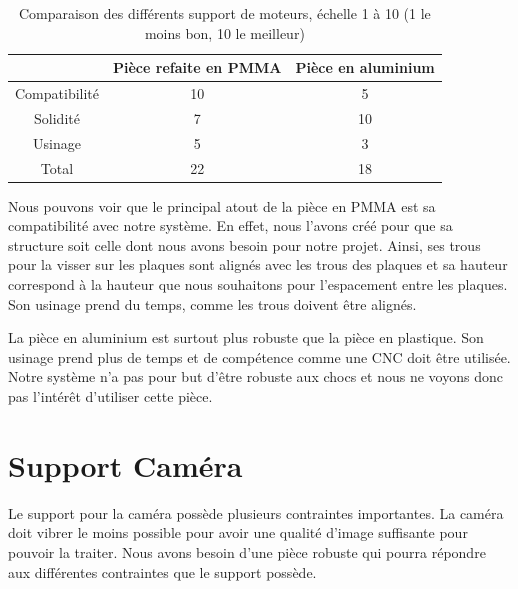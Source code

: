 \documentclass[
	a4paper,									%
	11pt,										%
	twoside,									%
	openright,									%
	notitlepage,									%
	parskip=half,								%
]{scrreprt}										%
\begin{document}
\begin{table}[!ht]
    \begin{center}
        \vspace{5mm}
        \label{tab:table5}
        \begin{tabular}{c|c|c} %
            \toprule
            \textbf{ } & \textbf{Pièce refaite en PMMA} & \textbf{Pièce en aluminium}\\
            \midrule
            Compatibilité & 10 & 5\\
            Solidité & 7 & 10\\
            Usinage & 5 & 3\\
			\midrule
			Total & 22 & 18\\
            \bottomrule
        \end{tabular}
    \end{center}    
	\caption{Comparaison des différents support de moteurs, échelle 1 à 10 (1 le moins bon, 10 le meilleur)}
\end{table}

Nous pouvons voir que le principal atout de la pièce en PMMA est sa compatibilité avec notre système. En effet, nous l'avons 
créé pour que sa structure soit celle dont nous avons besoin pour notre projet. Ainsi, ses trous pour la visser sur les plaques
sont alignés avec les trous des plaques et sa hauteur correspond à la hauteur que nous souhaitons pour l'espacement entre les 
plaques. Son usinage prend du temps, comme les trous doivent être alignés. \par

La pièce en aluminium est surtout plus robuste que la pièce en plastique. Son usinage prend plus de temps et de compétence 
comme une CNC doit être utilisée. Notre système n'a pas pour but d'être robuste aux chocs et nous ne voyons donc pas l'intérêt
d'utiliser cette pièce. \par

\newpage
\section{Support Caméra}

Le support pour la caméra possède plusieurs contraintes importantes. La caméra doit vibrer le moins possible
pour avoir une qualité d'image suffisante pour pouvoir la traiter. Nous avons besoin d'une pièce robuste qui 
pourra répondre aux différentes contraintes que le support possède. \par
\end{document}
